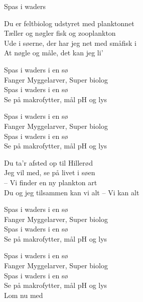 \begin{song}{Spas i waders}
  \begin{SBVerse}
Du er feltbiolog udstyret med planktonnet\\
Tæller og nøgler fisk og zooplankton\\
Ude i søerne, der har jeg net med småfisk i\\
At nøgle og måle, det kan jeg li'
  \end{SBVerse}

  \begin{SBChorus}
Spas i waders i en sø\\
Fanger Myggelarver, Super biolog\\
Spas i waders i en sø\\
Se på makrofytter, mål pH og lys
  \end{SBChorus}

  \begin{SBChorus}
Spas i waders i en sø\\
Fanger Myggelarver, Super biolog\\
Spas i waders i en sø\\
Se på makrofytter, mål pH og lys
  \end{SBChorus}



  \begin{SBSection*}
Du ta'r afsted op til Hillerød\\
Jeg vil med, se på livet i søen\\
 -- Vi finder en ny plankton art\\
Du og jeg tilsammen kan vi alt
 -- Vi kan alt
  \end{SBSection*}

  \begin{SBChorus}
Spas i waders i en sø\\
Fanger Myggelarver, Super biolog\\
Spas i waders i en sø\\
Se på makrofytter, mål pH og lys\
  \end{SBChorus}

  \begin{SBChorus}
Spas i waders i en sø\\
Fanger Myggelarver, Super biolog\\
Spas i waders i en sø\\
Se på makrofytter, mål pH og lys\\
Lom nu med
  \end{SBChorus}


\end{song}